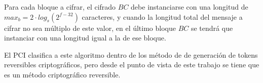 
Para cada bloque a cifrar, el cifrado $BC$ debe instanciarse con una longitud
de $max_b = 2 \cdot log_s(2^{f-32})$ caracteres, y cuando la longitud total
del mensaje a cifrar no sea múltiplo de este valor, en el último bloque $BC$
se tendrá que instanciar con una longitud igual a la de ese bloque.

%
%
%

El PCI clasifica a este algoritmo dentro de los método de de generación de
tokens reversibles criptográficos, pero desde el punto de vista de este
trabajo se tiene que es un método criptográfico reversible.
